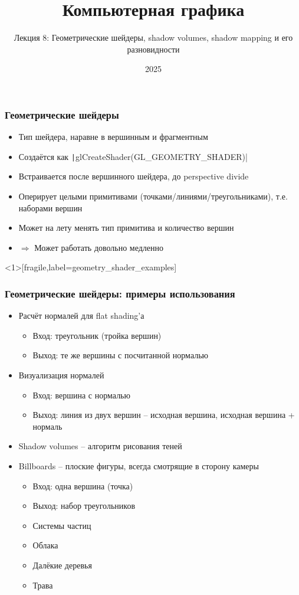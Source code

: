 \documentclass[10pt]{beamer}
\title{Компьютерная графика}
\subtitle{Лекция 8: Геометрические шейдеры, shadow volumes, shadow mapping и его разновидности}
\date{2025}
\begin{document}

\frame{\titlepage}

\begin{frame}[fragile]
\frametitle{Геометрические шейдеры}
\begin{itemize}
\item Тип шейдера, наравне в вершинным и фрагментным
\pause
\item Создаётся как \texttt|glCreateShader(GL_GEOMETRY_SHADER)|
\pause
\item Встраивается после вершинного шейдера, до perspective divide
\pause
\item Оперирует целыми примитивами (точками/линиями/треугольниками), т.е. наборами вершин
\pause
\item Может на лету менять тип примитива и количество вершин
\pause
\item \begin{math}\Longrightarrow\end{math} Может работать довольно медленно
\end{itemize}
\end{frame}

\begin{frame}<1>[fragile,label=geometry_shader_examples]
\frametitle{Геометрические шейдеры: примеры использования}
\fontsize{10pt}{10pt}
\begin{itemize}
\item Расчёт нормалей для flat shading'а
\pause
\begin{itemize}
\item Вход: треугольник (тройка вершин)
\item Выход: те же вершины с посчитанной нормалью
\end{itemize}
\pause
\item Визуализация нормалей
\pause
\begin{itemize}
\item Вход: вершина с нормалью
\item Выход: линия из двух вершин -- исходная вершина, исходная вершина + нормаль
\end{itemize}
\pause
\item Shadow volumes -- алгоритм рисования теней
\pause
\item Billboards -- плоские фигуры, всегда смотрящие в сторону камеры
\pause
\begin{itemize}
\item Вход: одна вершина (точка)
\item Выход: набор треугольников
\pause
\item Системы частиц
\pause
\item Облака
\pause
\item Далёкие деревья
\pause
\item Трава
\end{itemize}
\end{itemize}
\end{frame}
\end{document}
